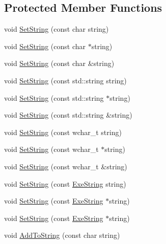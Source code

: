 \subsection*{Protected Member Functions}
\begin{DoxyCompactItemize}
\item 
void \hyperlink{class_tri_1_1_util_1_1_exe_string_a490e5cecd3a8ecc2c74e0105c2726130}{Set\+String} (const char string)
\item 
void \hyperlink{class_tri_1_1_util_1_1_exe_string_a6e2d85c7e9623f30ed094ad68737752a}{Set\+String} (const char $\ast$string)
\item 
void \hyperlink{class_tri_1_1_util_1_1_exe_string_a806c54aaa0fd692d26094c5a95c5213e}{Set\+String} (const char \&string)
\item 
void \hyperlink{class_tri_1_1_util_1_1_exe_string_a8407ab911c1ffdb83589c7572279dc3b}{Set\+String} (const std\+::string string)
\item 
void \hyperlink{class_tri_1_1_util_1_1_exe_string_ab31b05b70ed1666f4514c6a609734971}{Set\+String} (const std\+::string $\ast$string)
\item 
void \hyperlink{class_tri_1_1_util_1_1_exe_string_a220db3fb167f14badeb809ec17763739}{Set\+String} (const std\+::string \&string)
\item 
void \hyperlink{class_tri_1_1_util_1_1_exe_string_a2fee95fb145b914b3edf865ff781085c}{Set\+String} (const wchar\+\_\+t string)
\item 
void \hyperlink{class_tri_1_1_util_1_1_exe_string_ac80badebe191062f7839658bd02ec0cc}{Set\+String} (const wchar\+\_\+t $\ast$string)
\item 
void \hyperlink{class_tri_1_1_util_1_1_exe_string_ac585091ae28e660c76d74e7b16ba5239}{Set\+String} (const wchar\+\_\+t \&string)
\item 
void \hyperlink{class_tri_1_1_util_1_1_exe_string_afe4cbc733ab8fca8584c2289d4ebc9c7}{Set\+String} (const \hyperlink{class_tri_1_1_util_1_1_exe_string}{Exe\+String} string)
\item 
void \hyperlink{class_tri_1_1_util_1_1_exe_string_adb26420e7987d35046e0cac8e1c8d9d8}{Set\+String} (const \hyperlink{class_tri_1_1_util_1_1_exe_string}{Exe\+String} $\ast$string)
\item 
void \hyperlink{class_tri_1_1_util_1_1_exe_string_adb26420e7987d35046e0cac8e1c8d9d8}{Set\+String} (const \hyperlink{class_tri_1_1_util_1_1_exe_string}{Exe\+String} $\ast$string)
\item 
void \hyperlink{class_tri_1_1_util_1_1_exe_string_a08c3af40400941b878bc6551367b7bc7}{Add\+To\+String} (const char string)

\end{DoxyCompactItemize}
